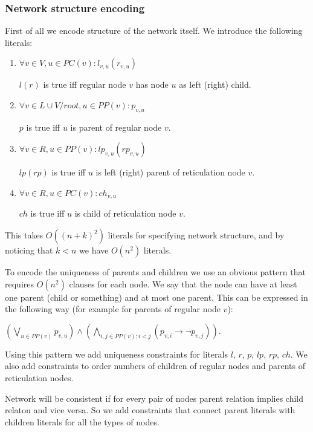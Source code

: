 \documentclass[runningheads, envcountsame, a4paper]{llncs}
\begin{document}
\subsubsection{Network structure encoding} 

First of all we encode structure of the network itself. We introduce the following literals: 

\begin{enumerate}

\item $\forall v \in V, u \in PC(v) : l_{v,u}(r_{v,u})$ 

$l (r)$ is true iff regular node $v$ has node $u$ as left (right) child.

\item $\forall v \in L \cup V / root, u \in PP(v) : p_{v,u}$ 

$p$ is true iff $u$ is parent of regular node $v$.

\item $\forall v \in R, u \in PP(v) : lp_{v,u}(rp_{v,u})$ 

$lp (rp)$ is true iff $u$ is left (right) parent of reticulation node $v$.

\item $\forall v \in R, u \in PC(v) : ch_{v,u}$ 

$ch$ is true iff $u$ is child of reticulation node $v$.

\end{enumerate}

This takes $O((n + k)^2)$ literals for specifying network structure, and by noticing that $k < n$ we have $O(n^2)$ literals.

To encode the uniqueness of parents and children we use an obvious pattern that requires $O(n^2)$ clauses for each node. We say 
that the node can have at least one parent (child or something) and at most one parent. This can be expressed 
in the following way (for example for parents of regular node $v$): 

$(\bigvee\limits_{u \in PP(v)} p_{v,u}) \wedge (\bigwedge\limits_{i, j \in PP(v);i < j} (p_{v,i} \rightarrow \neg p_{v,j}))$.

Using this pattern we add uniqueness constraints for literals $l$, $r$, $p$, $lp$, $rp$, $ch$. We also add constraints to order numbers of children of regular nodes and parents of reticulation nodes.

Network will be consistent if for every pair of nodes parent relation implies child relaton and vice versa. So we add constraints that connect parent literals with children literals for all the types of nodes.
\end{document}
